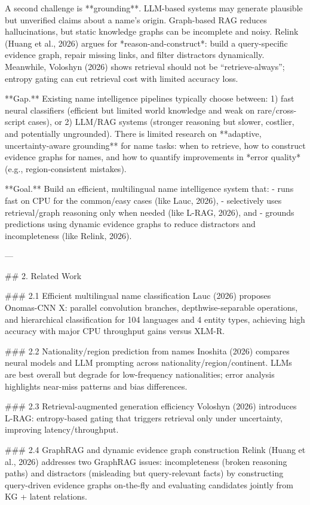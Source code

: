 A second challenge is **grounding**. LLM-based systems may generate plausible but unverified claims about a name’s origin. Graph-based RAG reduces hallucinations, but static knowledge graphs can be incomplete and noisy. Relink (Huang et al., 2026) argues for *reason-and-construct*: build a query-specific evidence graph, repair missing links, and filter distractors dynamically. Meanwhile, Voloshyn (2026) shows retrieval should not be “retrieve-always”; entropy gating can cut retrieval cost with limited accuracy loss.

**Gap.** Existing name intelligence pipelines typically choose between:  
1) fast neural classifiers (efficient but limited world knowledge and weak on rare/cross-script cases), or  
2) LLM/RAG systems (stronger reasoning but slower, costlier, and potentially ungrounded).  
There is limited research on **adaptive, uncertainty-aware grounding** for name tasks: when to retrieve, how to construct evidence graphs for names, and how to quantify improvements in *error quality* (e.g., region-consistent mistakes).

**Goal.** Build an efficient, multilingual name intelligence system that:  
- runs fast on CPU for the common/easy cases (like Lauc, 2026),  
- selectively uses retrieval/graph reasoning only when needed (like L-RAG, 2026), and  
- grounds predictions using dynamic evidence graphs to reduce distractors and incompleteness (like Relink, 2026).

---

## 2. Related Work  

### 2.1 Efficient multilingual name classification  
Lauc (2026) proposes Onomas-CNN X: parallel convolution branches, depthwise-separable operations, and hierarchical classification for 104 languages and 4 entity types, achieving high accuracy with major CPU throughput gains versus XLM-R.

### 2.2 Nationality/region prediction from names  
Inoshita (2026) compares neural models and LLM prompting across nationality/region/continent. LLMs are best overall but degrade for low-frequency nationalities; error analysis highlights near-miss patterns and bias differences.

### 2.3 Retrieval-augmented generation efficiency  
Voloshyn (2026) introduces L-RAG: entropy-based gating that triggers retrieval only under uncertainty, improving latency/throughput.

### 2.4 GraphRAG and dynamic evidence graph construction  
Relink (Huang et al., 2026) addresses two GraphRAG issues: incompleteness (broken reasoning paths) and distractors (misleading but query-relevant facts) by constructing query-driven evidence graphs on-the-fly and evaluating candidates jointly from KG + latent relations.

